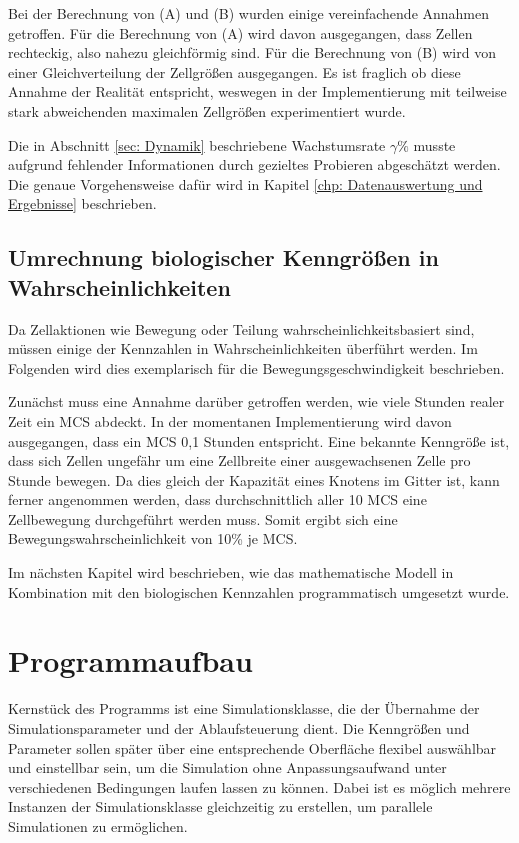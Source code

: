 \documentclass[11pt,a4paper,pointlessnumbers]{scrreprt}  %
\begin{document}
Bei der Berechnung von (A) und (B) wurden einige vereinfachende Annahmen getroffen. Für die Berechnung von (A) wird davon ausgegangen, dass Zellen rechteckig, also nahezu gleichförmig sind. Für die Berechnung von (B) wird von einer Gleichverteilung der Zellgrößen ausgegangen. Es ist fraglich ob diese Annahme der Realität entspricht, weswegen in der Implementierung mit teilweise stark abweichenden maximalen Zellgrößen experimentiert wurde. 

Die in Abschnitt \ref{sec: Dynamik} beschriebene Wachstumsrate $\gamma \%$ musste aufgrund fehlender Informationen durch gezieltes Probieren abgeschätzt werden. Die genaue Vorgehensweise dafür wird in Kapitel \ref{chp: Datenauswertung und Ergebnisse} beschrieben. 

\section{Umrechnung biologischer Kenngrößen in Wahrscheinlichkeiten}
Da Zellaktionen wie Bewegung oder Teilung wahrscheinlichkeitsbasiert sind, müssen einige der Kennzahlen in Wahrscheinlichkeiten überführt werden. Im Folgenden wird dies exemplarisch für die Bewegungsgeschwindigkeit beschrieben. \par
Zunächst muss eine Annahme darüber getroffen werden, wie viele Stunden realer Zeit ein MCS abdeckt. In der momentanen Implementierung wird davon ausgegangen, dass ein MCS 0,1 Stunden entspricht. Eine bekannte Kenngröße ist, dass sich Zellen ungefähr um eine Zellbreite einer ausgewachsenen Zelle pro Stunde bewegen. Da dies gleich der Kapazität eines Knotens im Gitter ist, kann ferner angenommen werden, dass durchschnittlich aller 10 MCS eine Zellbewegung durchgeführt werden muss. Somit ergibt sich eine Bewegungswahrscheinlichkeit von 10\% je MCS. \par 

Im nächsten Kapitel wird beschrieben, wie das mathematische Modell in Kombination mit den biologischen Kennzahlen programmatisch umgesetzt wurde. 

\chapter{Programmaufbau}
Kernstück des Programms ist eine Simulationsklasse, die der Übernahme der Simulationsparameter und der Ablaufsteuerung dient. Die Kenngrößen und Parameter sollen später über eine entsprechende Oberfläche flexibel auswählbar und einstellbar sein, um die Simulation ohne Anpassungsaufwand unter verschiedenen Bedingungen laufen lassen zu können. Dabei ist es möglich mehrere Instanzen der Simulationsklasse gleichzeitig zu erstellen, um parallele Simulationen zu ermöglichen. \par 
\end{document}
